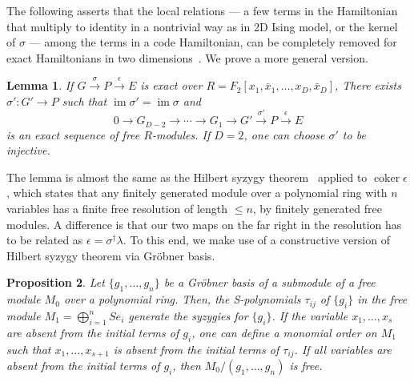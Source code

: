\documentclass[letterpaper,12pt]{amsart}
\newtheorem{lem}{Lemma}[section]
\newtheorem{prop}[lem]{Proposition}
\theoremstyle{definition} \newtheorem{defn}{Definition}
\theoremstyle{definition} \newtheorem{rem}{Remark}
\theoremstyle{definition} \newtheorem{example}{Example}
\newcommand{\im}{\mathop{\mathrm{im}}}
\newcommand{\coker}{\mathop{\mathrm{coker}}}
\begin{document}
The following asserts that the local relations --- 
a few terms in the Hamiltonian that multiply to identity in a nontrivial way
as in 2D Ising model, or the kernel of $\sigma$ ---
among the terms in a code Hamiltonian,
can be completely removed for exact Hamiltonians in two dimensions~\cite{Bombin2011Structure}.
We prove a more general version.
\begin{lem}
If $G \xrightarrow{\sigma} P \xrightarrow{\epsilon} E$ is exact
over $R = F_2[ x_1, \bar x_1, \ldots, x_D, \bar x_D ]$,
There exists $\sigma' : G' \to P$ such that $\im \sigma' = \im \sigma$ and
\[
 0 \to G_{D-2} \to \cdots \to G_1 \to G' \xrightarrow{\sigma'} P \xrightarrow{\epsilon} E
\]
is an exact sequence of free $R$-modules. If $D=2$, one can choose $\sigma'$ to be injective.
\label{lem:coker-epsilon-resolution-length-D}
\end{lem}
\noindent
The lemma is almost the same as the Hilbert syzygy theorem~\cite[Corollary~15.11]{Eisenbud}
applied to $\coker \epsilon$,
which states that any finitely generated module over a polynomial ring with $n$ variables
has a finite free resolution of length $\le n$, by finitely generated free modules.
A difference is that our two maps on the far right in the resolution 
has to be related as $\epsilon = \sigma^\dagger \lambda$.
To this end, we make use of a constructive version of Hilbert syzygy theorem via Gr\"obner basis.
\begin{prop}\cite[Theorem~15.10, Corollary~15.11]{Eisenbud}
Let $\{ g_1, \ldots, g_n \}$ be a Gr\"obner basis of a submodule of
a free module $M_0$ over a polynomial ring.
Then, the S-polynomials $\tau_{ij}$ of $\{ g_i \}$
in the free module $M_1 = \bigoplus_{i=1}^n S e_i$
generate the syzygies for $\{g_i\}$.
If the variable $x_1,\ldots, x_s$ are absent from the initial terms of $g_i$,
one can define a monomial order on $M_1$
such that $x_1,\ldots,x_{s+1}$ is absent from
the initial terms of $\tau_{ij}$.
If all variables are absent from the initial terms of $g_i$,
then $M_0/(g_1,\ldots,g_n)$ is free.
\label{prop:constructive-syzygy}
\end{prop}
\end{document}
